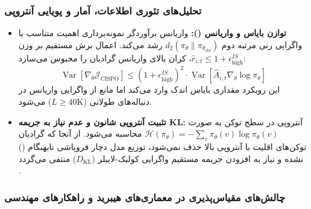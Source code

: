 \subsubsection*{تحلیل‌های تئوری اطلاعات، آمار و پویایی آنتروپی}

\begin{itemize}
    \item \textbf{توازن بایاس و واریانس ():} واریانس برآوردگر نمونه‌برداری اهمیت متناسب با واگرایی رنی مرتبه دوم $d_2(\pi_\theta \parallel \pi_{\theta_{\text{old}}})$ رشد می‌کند. اعمال برش مستقیم بر وزن $\hat{r}_{i,t} \le 1 + \epsilon_{\text{high}}^{IS}$، کران بالای واریانس گرادیان را محبوس می‌سازد:
    \begin{equation}
    	\operatorname{Var}\left[ \nabla_\theta \mathcal{J}_{\text{CISPO}} \right] \le (1 + \epsilon_{\text{high}}^{IS})^2 \cdot \operatorname{Var}\left[ \hat{A}_{i,t} \nabla_\theta \log \pi_\theta \right]
    \end{equation}
    این رویکرد مقداری بایاس اندک وارد می‌کند اما مانع از واگرایی واریانس در دنباله‌های طولانی ($L \ge 40\text{K}$) می‌شود.
    \item \textbf{تثبیت آنتروپی شانون و عدم نیاز به جریمه KL:} آنتروپی در سطح توکن به صورت $\mathcal{H}(\pi_\theta) = -\sum_{v} \pi_\theta(v) \log \pi_\theta(v)$ محاسبه می‌شود. از آنجا که گرادیان توکن‌های اقلیت با آنتروپی بالا حذف نمی‌شود، توزیع مدل دچار فروپاشی نابهنگام () نشده و نیاز به افزودن جریمه مستقیم واگرایی کولبک-لایبلر ($D_{\text{KL}}$) منتفی می‌گردد \cite{wang2025beyond}.
\end{itemize}

\subsubsection*{چالش‌های مقیاس‌پذیری در معماری‌های هیبرید و راهکارهای مهندسی}

